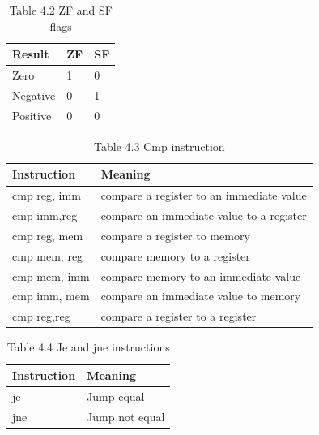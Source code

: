 \documentclass[10pt]{article}
\begin{document}
\begin{table}[h]
\begin{center}
\captionsetup{labelformat=empty}
\caption{Table 4.2 ZF and SF flags}
\begin{tabular}{|l|l|l|}
\hline
Result & ZF & SF \\
\hline
Zero & 1 & 0 \\
\hline
Negative & 0 & 1 \\
\hline
Positive & 0 & 0 \\
\hline
\end{tabular}
\end{center}
\end{table}

\begin{table}[h]
\begin{center}
\captionsetup{labelformat=empty}
\caption{Table 4.3 Cmp instruction}
\begin{tabular}{|l|l|}
\hline
Instruction & Meaning \\
\hline
cmp reg, imm & compare a register to an immediate value \\
\hline
cmp imm,reg & compare an immediate value to a register \\
\hline
cmp reg, mem & compare a register to memory \\
\hline
cmp mem, reg & compare memory to a register \\
\hline
cmp mem, imm & compare memory to an immediate value \\
\hline
cmp imm, mem & compare an immediate value to memory \\
\hline
cmp reg,reg & compare a register to a register \\
\hline
\end{tabular}
\end{center}
\end{table}

\begin{table}[h]
\begin{center}
\captionsetup{labelformat=empty}
\caption{Table 4.4 Je and jne instructions}
\begin{tabular}{|l|l|}
\hline
Instruction & Meaning \\
\hline
je & Jump equal \\
\hline
jne & Jump not equal \\
\hline
\end{tabular}
\end{center}
\end{table}
\end{document}

